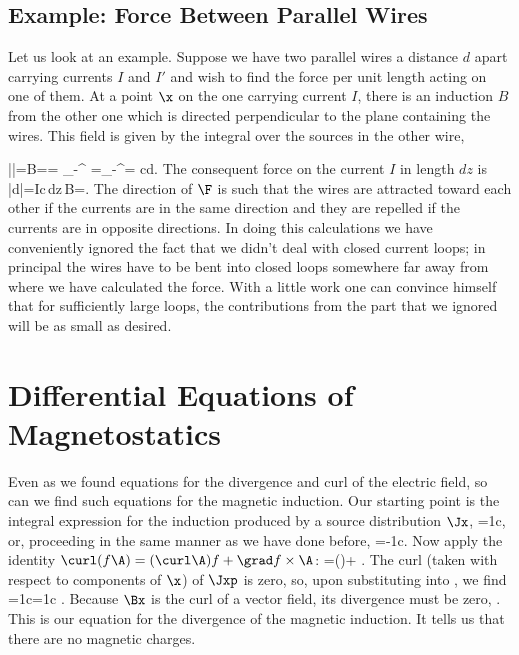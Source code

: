 {\subsection{Example: Force Between Parallel Wires}
Let us look at an example. Suppose we have two parallel wires a distance
$d$ apart carrying currents $I$ and $I'$ and wish to find the force per
unit length acting on one of them. At a point $\x$ on the one carrying
current $I$, there is an induction $B$ from the other one which is directed
perpendicular to the plane containing the wires. This field is given by the
integral over the sources in the other wire,

\centerline{}

\beq
|\B|=B=\int{}=
\int_{-\infty}^\infty {}
=\int_{-\infty}^\infty {}=
{cd}.
\eeq
The consequent force on the current $I$ in length $dz$ is
\beq
|d\F|=\frac Ic\,dz\,B=.
\eeq
The direction of $\F$ is such that the wires are attracted toward each
other if the currents are in the same direction and they are repelled if
the currents are in opposite directions. In doing this calculations we
have conveniently ignored the fact that we didn't deal with closed current
loops; in principal the wires have to be bent into closed loops somewhere
far away from where we have calculated the force. With a little work one
can convince himself that for sufficiently large loops, the contributions
from the part that we ignored will be as small as desired.

\section{Differential Equations of Magnetostatics}
Even as we found equations for the divergence and curl of the electric
field, so can we find such equations for the magnetic induction. Our
starting point is the integral expression for the induction produced by a
source distribution $\Jx$,
\beq
\Bx=\frac1c\inivp\Jxp\times{},
\eeq
or, proceeding in the same manner as we have done before,
\beq
\Bx=-\frac1c\inivp\Jxp\times\grad\lep\xxpi\rip.
\eeq
Now apply the identity $\curl(f\A)=(\curl\A)f+\grad f\times\A$:
\beq
\curl\lep\frac{\Jxp}{\xxpa}\rip=(\curl\Jxp)\xxpi+\grad\lep\xxpi\rip\times
\Jxp.
\eeq
The curl (taken with respect to components of $\x$) of $\Jxp$ is zero, so,
upon substituting into , we find
\beq
\Bx=\frac1c\inivp\curl\lep\frac{\Jxp}{\xxpa}\rip=\frac1c\curl\lep
\inivp\frac{\Jxp}{\xxpa}\rip.
\eeq
Because $\Bx$ is the curl of a vector field, its divergence must be zero,
\beq
\div{}.
\eeq
This is our equation for the divergence of the magnetic induction. It tells
us that there are no magnetic charges.

}
